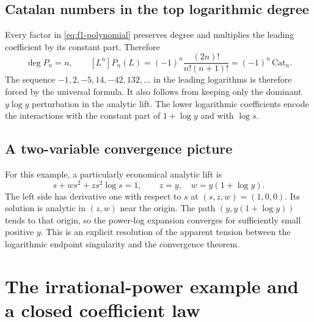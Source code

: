 \documentclass[11pt,a4paper]{article}
\numberwithin{equation}{section}
\theoremstyle{definition}\newtheorem{definition}[theorem]{Definition}
\theoremstyle{remark}\newtheorem{remark}[theorem]{Remark}
\begin{document}
\subsection{Catalan numbers in the top logarithmic degree}
Every factor in \eqref{eq:f1-polynomial} preserves degree and multiplies the
leading coefficient by its constant part. Therefore
\begin{equation}\label{eq:catalan}
 \deg P_n=n,\qquad
 [L^n]P_n(L)=(-1)^n\frac{(2n)!}{n!(n+1)!}
            =(-1)^n\,\mathrm{Cat}_n.
\end{equation}
The sequence \(-1,2,-5,14,-42,132,\ldots\) in the leading logarithms is
therefore forced by the universal formula. It also follows from keeping
only the dominant \(y\log y\) perturbation in the analytic lift.
The lower logarithmic coefficients encode the interactions with the constant
part of \(1+\log y\) and with \(\log s\).

\subsection{A two-variable convergence picture}
For this example, a particularly economical analytic lift is
\[
 s+w s^2+z s^2\log s=1,
 \qquad z=y,\quad w=y(1+\log y).
\]
The left side has derivative one with respect to \(s\) at \((s,z,w)=(1,0,0)\).
Its solution is analytic in \((z,w)\) near the origin. The path
\((y,y(1+\log y))\) tends to that origin, so the power-log expansion converges
for sufficiently small positive \(y\). This is an explicit resolution of the
apparent tension between the logarithmic endpoint singularity and the
convergence theorem.

\section{The irrational-power example and a closed coefficient law}
\label{sec:irrational}
\end{document}
